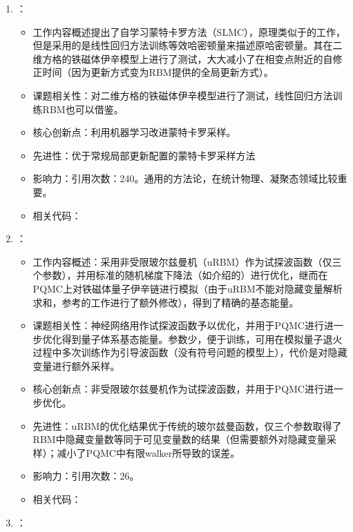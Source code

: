 \begin{enumerate}
\begin{itemize}
        \end{itemize}
        \item \citet{liu2017self}：
        \begin{itemize}
            \item 工作内容概述提出了自学习蒙特卡罗方法（SLMC），原理类似于\citet{huang2017accelerated}的工作，但是采用的是线性回归方法训练等效哈密顿量来描述原哈密顿量。其在二维方格的铁磁体伊辛模型上进行了测试，大大减小了在相变点附近的自修正时间（因为更新方式变为RBM提供的全局更新方式）。
            \item 课题相关性：对二维方格的铁磁体伊辛模型进行了测试，线性回归方法训练RBM也可以借鉴。
            \item 核心创新点：利用机器学习改进蒙特卡罗采样。
            \item 先进性：优于常规局部更新配置的蒙特卡罗采样方法
            \item 影响力：引用次数：240。通用的方法论，在统计物理、凝聚态领域比较重要。
            \item 相关代码：
        \end{itemize}
        \item \citet{inack2018projective}：
            \begin{itemize}
                \item 工作内容概述：采用非受限玻尔兹曼机（uRBM）作为试探波函数（仅三个参数），并用标准的随机梯度下降法（如\citet{becca2017quantum}介绍的）进行优化，继而在PQMC上对铁磁体量子伊辛链进行模拟（由于uRBM不能对隐藏变量解析求和，参考\citet{vitiello1991green}的工作进行了额外修改），得到了精确的基态能量。
                \item 课题相关性：神经网络用作试探波函数予以优化，并用于PQMC进行进一步优化得到量子体系基态能量。参数少，便于训练，可用在模拟量子退火过程中多次训练作为引导波函数（没有符号问题的模型上），代价是对隐藏变量进行额外采样。
                \item 核心创新点：非受限玻尔兹曼机作为试探波函数，并用于PQMC进行进一步优化。
                \item 先进性：uRBM的优化结果优于传统的玻尔兹曼函数，仅三个参数取得了RBM中隐藏变量数等同于可见变量数的结果（但需要额外对隐藏变量采样）；减小了PQMC中有限walker所导致的误差。
                \item 影响力：引用次数：26。
                \item 相关代码：
            \end{itemize}
        \item \citet{saito2018machine}：
            \begin{itemize}

\end{itemize}
\end{enumerate}
